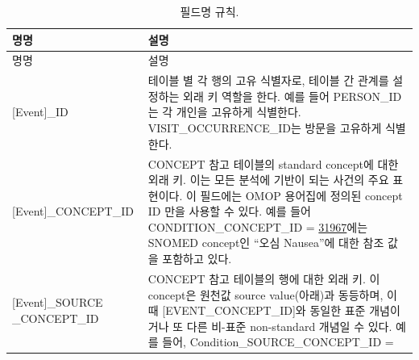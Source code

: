 \documentclass[10.5pt]{book}
\theoremstyle{definition}
\theoremstyle{definition}
\theoremstyle{definition}
\theoremstyle{remark}
\begin{document}
\begin{longtable}[]{@{}ll@{}}
\caption{\label{tab:fieldConventions} 필드명 규칙.}\tabularnewline
\toprule
\begin{minipage}[b]{0.34\columnwidth}\raggedright\strut
명명\strut
\end{minipage} & \begin{minipage}[b]{0.60\columnwidth}\raggedright\strut
설명\strut
\end{minipage}\tabularnewline
\midrule
\endfirsthead
\toprule
\begin{minipage}[b]{0.34\columnwidth}\raggedright\strut
명명\strut
\end{minipage} & \begin{minipage}[b]{0.60\columnwidth}\raggedright\strut
설명\strut
\end{minipage}\tabularnewline
\midrule
\endhead
\begin{minipage}[t]{0.34\columnwidth}\raggedright\strut
{[}Event{]}\_ID\strut
\end{minipage} & \begin{minipage}[t]{0.60\columnwidth}\raggedright\strut
테이블 별 각 행의 고유 식별자로, 테이블 간 관계를 설정하는 외래 키
역할을 한다. 예를 들어 PERSON\_ID는 각 개인을 고유하게 식별한다.
VISIT\_OCCURRENCE\_ID는 방문을 고유하게 식별한다.\strut
\end{minipage}\tabularnewline
\begin{minipage}[t]{0.34\columnwidth}\raggedright\strut
{[}Event{]}\_CONCEPT\_ID\strut
\end{minipage} & \begin{minipage}[t]{0.60\columnwidth}\raggedright\strut
CONCEPT 참고 테이블의 standard concept에 대한 외래 키. 이는 모든 분석에
기반이 되는 사건의 주요 표현이다. 이 필드에는 OMOP 용어집에 정의된
concept ID 만을 사용할 수 있다. 예를 들어 CONDITION\_CONCEPT\_ID =
\href{http://athena.ohdsi.org/search-terms/terms/31967}{31967}에는
SNOMED concept인 ``오심 Nausea''에 대한 참조 값을 포함하고 있다.\strut
\end{minipage}\tabularnewline
\begin{minipage}[t]{0.34\columnwidth}\raggedright\strut
{[}Event{]}\_SOURCE \_CONCEPT\_ID\strut
\end{minipage} & \begin{minipage}[t]{0.60\columnwidth}\raggedright\strut
CONCEPT 참고 테이블의 행에 대한 외래 키. 이 concept은 원천값 source
value(아래)과 동등하며, 이때 {[}EVENT\_CONCEPT\_ID{]}와 동일한 표준
개념이거나 또 다른 비-표준 non-standard 개념일 수 있다. 예를 들어,
Condition\_SOURCE\_CONCEPT\_ID =

\end{minipage}
\end{longtable}
\end{document}
